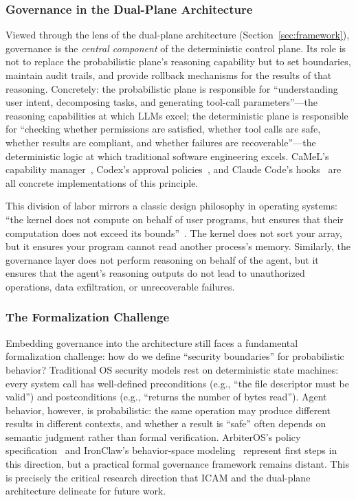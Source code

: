 \documentclass[11pt,a4paper]{article}
\begin{document}
\subsubsection{Governance in the Dual-Plane Architecture}
Viewed through the lens of the dual-plane architecture (Section~\ref{sec:framework}), governance is the \emph{central component} of the deterministic control plane.
Its role is not to replace the probabilistic plane's reasoning capability but to set boundaries, maintain audit trails, and provide rollback mechanisms for the results of that reasoning.
Concretely:
the probabilistic plane is responsible for ``understanding user intent, decomposing tasks, and generating tool-call parameters''---the reasoning capabilities at which LLMs excel;
the deterministic plane is responsible for ``checking whether permissions are satisfied, whether tool calls are safe, whether results are compliant, and whether failures are recoverable''---the deterministic logic at which traditional software engineering excels.
CaMeL's capability manager~\cite{debenedetti2025camel}, Codex's approval policies~\cite{openai_codex_approvals_2026}, and Claude Code's hooks~\cite{anthropic_claudecode_security_2026} are all concrete implementations of this principle.

This division of labor mirrors a classic design philosophy in operating systems: ``the kernel does not compute on behalf of user programs, but ensures that their computation does not exceed its bounds''~\cite{ostep_2023}.
The kernel does not sort your array, but it ensures your program cannot read another process's memory.
Similarly, the governance layer does not perform reasoning on behalf of the agent, but it ensures that the agent's reasoning outputs do not lead to unauthorized operations, data exfiltration, or unrecoverable failures.

\subsubsection{The Formalization Challenge}
Embedding governance into the architecture still faces a fundamental formalization challenge: how do we define ``security boundaries'' for probabilistic behavior?
Traditional OS security models rest on deterministic state machines: every system call has well-defined preconditions (e.g., ``the file descriptor must be valid'') and postconditions (e.g., ``returns the number of bytes read'').
Agent behavior, however, is probabilistic: the same operation may produce different results in different contexts, and whether a result is ``safe'' often depends on semantic judgment rather than formal verification.
ArbiterOS's policy specification~\cite{arbiteros2025} and IronClaw's behavior-space modeling~\cite{ironclaw2025} represent first steps in this direction, but a practical formal governance framework remains distant.
This is precisely the critical research direction that ICAM and the dual-plane architecture delineate for future work.
\end{document}
